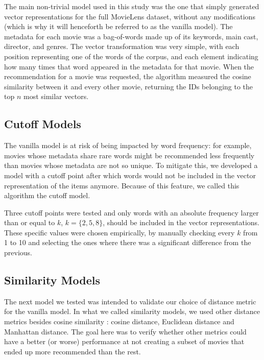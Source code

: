 The main non-trivial model used in this study was the one that simply generated
vector representations for the full MovieLens dataset, without any modifications
(which is why it will henceforth be referred to as the vanilla model). The
metadata for each movie was a bag-of-words made up of its keywords, main cast,
director, and genres. The vector transformation was very simple, with each
position representing one of the words of the corpus, and each element
indicating how many times that word appeared in the metadata for that movie.
When the recommendation for a movie was requested, the algorithm measured the
cosine similarity between it and every other movie, returning the IDs belonging
to the top $n$ most similar vectors.

\subsection{Cutoff Models}
\label{subsec:cutoff}

The vanilla model is at risk of being impacted by word frequency: for example,
movies whose metadata share rare words might be recommended less frequently than
movies whose metadata are not so unique. To mitigate this, we developed a model
with a cutoff point after which words would not be included in the vector
representation of the items anymore. Because of this feature, we called this
algorithm the cutoff model.

Three cutoff points were tested and only words with an absolute frequency larger
than or equal to $k$, $k = \{2, 5, 8\}$, should be included in the vector
representations. These specific values were chosen empirically, by manually
checking every $k$ from 1 to 10 and selecting the ones where there was a
significant difference from the previous.

\subsection{Similarity Models}
\label{subsec:similarity}

The next model we tested was intended to validate our choice of distance metric
for the vanilla model. In what we called similarity models, we used other
distance metrics besides cosine similarity \citep{ricci_introduction_2011}:
cosine distance, Euclidean distance and Manhattan distance. The goal here was to
verify whether other metrics could have a better (or worse) performance at not
creating a subset of movies that ended up more recommended than the rest.

